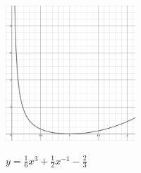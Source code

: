 \begin{enumerate}
\begin{enumerate}
\begin{center} 

\includegraphics[height=2in]{./PowerFunctionsGraphics/PURSUIT02.jpg}

 $y = \frac{1}{6}x^3+\frac{1}{2}x^{-1} - \frac{2}{3}$

\end{center}


\end{enumerate}






\setcounter{HW}{\value{enumi}}
\end{enumerate}


